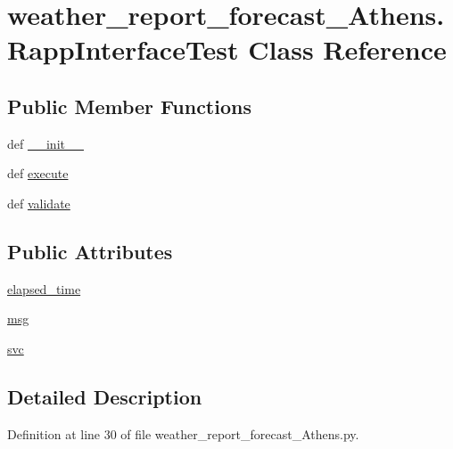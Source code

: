 \hypertarget{classweather__report__forecast__Athens_1_1RappInterfaceTest}{\section{weather\-\_\-report\-\_\-forecast\-\_\-\-Athens.\-Rapp\-Interface\-Test Class Reference}
\label{classweather__report__forecast__Athens_1_1RappInterfaceTest}
}
\subsection*{Public Member Functions}
\begin{DoxyCompactItemize}
\item 
def \hyperlink{classweather__report__forecast__Athens_1_1RappInterfaceTest_ae5c4401aba91fad0ffb560af5f3ec2b8}{\-\_\-\-\_\-init\-\_\-\-\_\-}
\item 
def \hyperlink{classweather__report__forecast__Athens_1_1RappInterfaceTest_a4073f9dd0f7bb5c69c1beeb3bf14c750}{execute}
\item 
def \hyperlink{classweather__report__forecast__Athens_1_1RappInterfaceTest_a495e83ab7c868ce2f26b7dc4a298c08a}{validate}
\end{DoxyCompactItemize}
\subsection*{Public Attributes}
\begin{DoxyCompactItemize}
\item 
\hyperlink{classweather__report__forecast__Athens_1_1RappInterfaceTest_a2dead28bf2bc85f3d3444a4cb26c5631}{elapsed\-\_\-time}
\item 
\hyperlink{classweather__report__forecast__Athens_1_1RappInterfaceTest_a8b66053935a541b6541221079c4d2a4d}{msg}
\item 
\hyperlink{classweather__report__forecast__Athens_1_1RappInterfaceTest_a114263d7eb97783dc77472506436a17d}{svc}
\end{DoxyCompactItemize}


\subsection{Detailed Description}


Definition at line 30 of file weather\-\_\-report\-\_\-forecast\-\_\-\-Athens.\-py.



